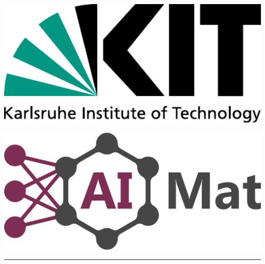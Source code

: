 \newcommand{\diameter}{20}
\newcommand{\xone}{-15}
\newcommand{\xtwo}{160}
\newcommand{\yone}{15}
\newcommand{\ytwo}{-253}


\begin{titlepage}

	\thispagestyle{alim}

	\noindent

	\noindent\begin{minipage}{0.25\textwidth}%
		\includegraphics[width=1\textwidth]{include/kitlogo.pdf}
	\end{minipage}
	\hfill
	\begin{minipage}{0.25\textwidth}\raggedleft
		\includegraphics[width=1\textwidth]{include/AiMat_logo_purple.png}
	\end{minipage}

    \centering

	\vspace*{4.0cm}

	\large\par\noindent\rule{\textwidth}{1.2pt}


\end{titlepage}
